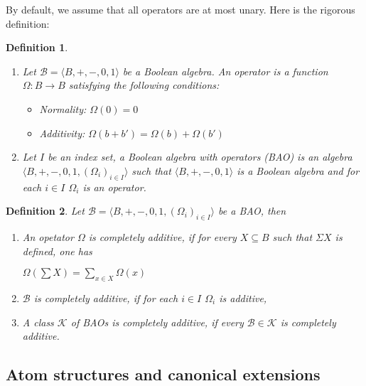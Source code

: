 \documentclass[a4paper]{article}
\theoremstyle{defin}
\newtheorem{defin}{Definition}
\theoremstyle{theorem}
\theoremstyle{claim}
\theoremstyle{prop}
\theoremstyle{lemma}
\theoremstyle{fact}
\theoremstyle{ex}
\theoremstyle{col}
\begin{document}
By default, we assume that all operators are at most unary. Here is the rigorous definition:

\begin{defin}

$ $

  \begin{enumerate}
    \item Let $\mathcal{B} = \langle B, +, -, 0, 1 \rangle$ be a Boolean algebra. An operator is a function $\Omega : B \to B$ satisfying the following conditions:
    \begin{itemize}
      \item Normality: $\Omega(0) = 0$
      \item Additivity: $\Omega(b + b') = \Omega(b) + \Omega(b')$
    \end{itemize}
    \item Let $I$ be an index set, a Boolean algebra with operators (BAO) is an algebra $\langle B, +, -, 0, 1, (\Omega_{i})_{i \in I} \rangle$ such that $\langle B, +, -, 0, 1 \rangle$ is a Boolean algebra and for each $i \in I$ $\Omega_{i}$ is an operator.
  \end{enumerate}
\end{defin}

\begin{defin} Let $\mathcal{B} = \langle B, +, -, 0, 1, (\Omega_{i})_{i \in I} \rangle$ be a BAO, then

  \begin{enumerate}
    \item An opetator $\Omega$ is completely additive, if for every $X \subseteq B$ such that $\Sigma X$ is defined, one has

    \begin{center}
      $\Omega(\sum X) = \sum \limits_{x \in X} \Omega(x)$
    \end{center}
    \item $\mathcal{B}$ is completely additive, if for each $i \in I$ $\Omega_{i}$ is additive,
    \item A class $\mathcal{K}$ of BAOs is completely additive, if every $\mathcal{B} \in \mathcal{K}$ is completely additive.
  \end{enumerate}
\end{defin}

\subsection{Atom structures and canonical extensions}
\end{document}
